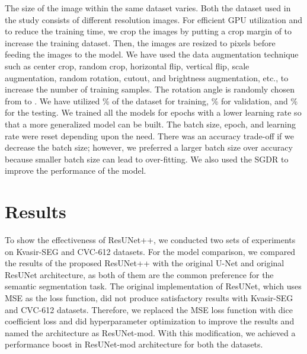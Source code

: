 \documentclass[conference]{IEEEtran}
\newcommand{\resunetplusplus}{ResUNet++\xspace}
\begin{document}
The size of the image within the same dataset varies. Both the dataset used in the study consists of different resolution images. For efficient GPU utilization and to reduce the training time, we crop the images by putting a crop margin of  to increase the training dataset. Then, the images are resized to  pixels before feeding the images to the model. We have used the data augmentation technique such as center crop, random crop, horizontal flip, vertical flip, scale augmentation, random rotation, cutout, and brightness augmentation, etc., to increase the number of training samples. The rotation angle is randomly chosen from  to \textdegree. We have utilized \% of the dataset for training, \% for validation, and \% for the testing. We trained all the models for  epochs with a lower learning rate so that a more generalized model can be built. The batch size, epoch, and learning rate were reset depending upon the need. There was an accuracy trade-off if we decrease the batch size; however, we preferred a larger batch size over accuracy because smaller batch size can lead to over-fitting. We also used the \ac{SGDR} to improve the performance of the model.


 \section{Results}
\label{section:Results}
To show the effectiveness of \resunetplusplus, we conducted two sets of experiments on Kvasir-SEG and CVC-612 datasets. For the model comparison, we compared the results of the proposed \resunetplusplus with the original U-Net and original ResUNet architecture, as both of them are the common preference for the semantic segmentation task. The original implementation of ResUNet, which uses \ac{MSE} as the loss function, did not produce satisfactory results with Kvasir-SEG and CVC-612 datasets. Therefore, we replaced the \ac{MSE} loss function with dice coefficient loss and did hyperparameter optimization to improve the results and named the architecture as ResUNet-mod. With this modification, we achieved a performance boost in ResUNet-mod architecture for both the datasets.
\end{document}
